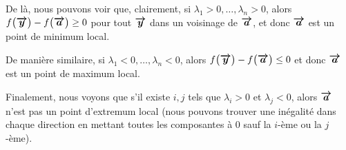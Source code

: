 \documentclass[a4paper]{article}
\begin{document}
{{        De là, nous pouvons voir que, clairement, si $\lambda_1 > 0, \ldots, \lambda_n > 0$, alors $f\left(\bvec{y}\right) - f\left(\bvec{a}\right) \geq 0$ pour tout $\bm{\protect\overrightarrow{y}}$ dans un voisinage de $\bm{\protect\overrightarrow{a}}$, et donc $\bm{\protect\overrightarrow{a}}$ est un point de minimum local. 

        De manière similaire, si $\lambda_1 < 0, \ldots, \lambda_n < 0$, alors $f\left(\bvec{y}\right) - f\left(\bvec{a}\right) \leq 0$ et donc $\bm{\protect\overrightarrow{a}}$ est un point de maximum local.

        Finalement, nous voyons que s'il existe $i, j$ tels que $\lambda_i > 0$ et $\lambda_j < 0$, alors $\bm{\protect\overrightarrow{a}}$ n'est pas un point d'extremum local (nous pouvons trouver une inégalité dans chaque direction en mettant toutes les composantes à 0 sauf la $i$-ème ou la $j$-ème).
    }
}
\end{document}
